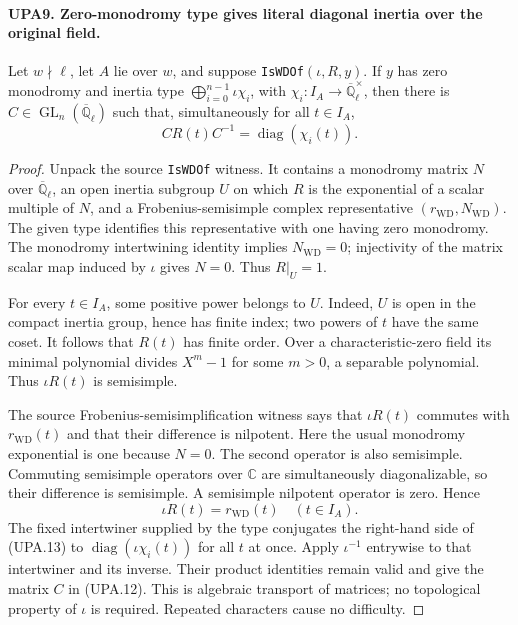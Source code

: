 \documentclass[11pt,a4paper]{article}
\numberwithin{equation}{section}
\theoremstyle{remark}\newtheorem{remark}[theorem]{Remark}
\begin{document}
\paragraph{UPA9. Zero-monodromy type gives literal diagonal inertia over the original field.}
\label{claim:UPA9}
Let $w\nmid\ell$, let $A$ lie over $w$, and suppose
\texttt{Is\allowbreak WDOf}$(\iota,R,y)$.
If $y$ has zero monodromy and inertia type
$\bigoplus_{i=0}^{n-1}\iota\chi_i$, with
$\chi_i:I_A\to\overline{\mathbb Q}_\ell^\times$,
then there is $C\in\operatorname{GL}_n(\overline{\mathbb Q}_\ell)$
such that, simultaneously for all $t\in I_A$,
\[
               C R(t) C^{-1}=\operatorname{diag}(\chi_i(t)).
 \tag{UPA.12}
\]
\begin{proof}
Unpack the source \texttt{Is\allowbreak WDOf} witness.  It contains a
monodromy matrix $N$ over $\overline{\mathbb Q}_\ell$, an
open inertia subgroup $U$ on which $R$ is the exponential
of a scalar multiple of $N$, and a Frobenius-semisimple
complex representative $(r_{\mathrm{WD}},N_{\mathrm{WD}})$.
The given type identifies this representative with one
having zero monodromy.  The monodromy intertwining
identity implies $N_{\mathrm{WD}}=0$; injectivity of the
matrix scalar map induced by $\iota$ gives $N=0$.
Thus $R|_U=1$.

For every $t\in I_A$, some positive power belongs to $U$.
Indeed, $U$ is open in the compact inertia group, hence
has finite index; two powers of $t$ have the same coset.
It follows that $R(t)$ has finite order.  Over a
characteristic-zero field its minimal polynomial divides
$X^m-1$ for some $m>0$, a separable polynomial.
Thus $\iota R(t)$ is semisimple.

The source Frobenius-semisimplification witness says that
$\iota R(t)$ commutes with $r_{\mathrm{WD}}(t)$ and that
their difference is nilpotent.  Here the usual monodromy
exponential is one because $N=0$.
The second operator is also semisimple.  Commuting
semisimple operators over $\mathbb C$ are simultaneously
diagonalizable, so their difference is semisimple.
A semisimple nilpotent operator is zero.  Hence
\[
                   \iota R(t)=r_{\mathrm{WD}}(t)
                   \quad(t\in I_A).                         \tag{UPA.13}
\]
The fixed intertwiner supplied by the type conjugates
the right-hand side of (UPA.13) to
$\operatorname{diag}(\iota\chi_i(t))$ for all $t$ at once.
Apply $\iota^{-1}$ entrywise to that intertwiner and its
inverse.  Their product identities remain valid and give
the matrix $C$ in (UPA.12).
This is algebraic transport of matrices; no topological
property of $\iota$ is required.  Repeated characters cause
no difficulty.
\end{proof}
\end{document}
